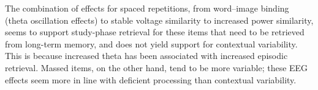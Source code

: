 The combination of effects for spaced repetitions, from word--image binding (theta oscillation effects) to stable voltage similarity to increased power similarity, seems to support study-phase retrieval for these items that need to be retrieved from long-term memory, and does not yield support for contextual variability.  This is because increased theta has been associated with increased episodic retrieval.  Massed items, on the other hand, tend to be more variable; these EEG effects seem more in line with deficient processing than contextual variability.

\cbend
